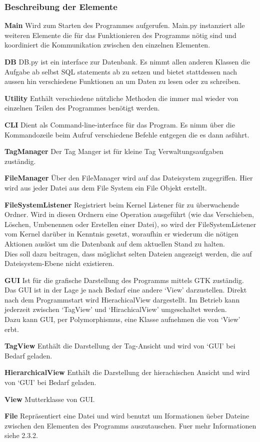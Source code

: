 \documentclass[10pt,paper=a4,final]{scrartcl}
\begin{document}
\subsubsection{Beschreibung der Elemente}
\begin{description}
  \item{\bf Main} Wird zum Starten des Programmes aufgerufen. Main.py instanziert alle weiteren Elemente die f\"ur das Funktionieren des Programms n\"otig sind und koordiniert die Kommunikation zwischen den einzelnen Elementen.
  \item{\bf DB} DB.py ist ein interface zur Datenbank. Es nimmt allen anderen Klassen die Aufgabe ab selbst SQL statements ab zu setzen und bietet stattdessen nach aussen hin verschiedene Funktionen an um Daten zu lesen oder zu schreiben.
  \item{\bf Utility} Enth\"alt verschiedene n\"utzliche Methoden die immer mal wieder von einzelnen Teilen des Programmes ben\"otigt werden.
  \item{\bf CLI} Dient als Command-line-interface f\"ur das Program. Es nimm \"uber die Kommandozeile beim Aufruf verschiedene Befehle entgegen die es dann asf\"uhrt.
  \item{\bf TagManager} Der Tag Manger ist für kleine Tag Verwaltungsaufgaben zuständig.
  \item{\bf FileManager} Über den FileManager wird auf das Dateisystem zugegriffen. Hier wird aus jeder Datei aus dem File System ein File Objekt erstellt.
  \item{\bf FileSystemListener} Registriert beim Kernel Listener f\"ur zu \"uberwachende Ordner. Wird in diesen Ordnern eine Operation ausgef\"uhrt (wie das Verschieben, L\"oschen, Umbenennen oder Erstellen einer Datei), so wird der FileSystemListener vom Kernel dar\"uber in Kenntnis gesetzt, woraufhin er wiederum die n\"otigen Aktionen ausl\"ost um die Datenbank auf dem aktuellen Stand zu halten.\\
    Dies soll dazu beitragen, dass m\"oglichst selten Dateien angezeigt werden, die auf Dateisystem-Ebene nicht existieren.
  \item{\bf GUI} Ist f\"ur die grafische Darstellung des Programms mittels GTK zust\"andig. Das GUI ist in der Lage je nach Bedarf eine andere ‘View’ darzustellen. Direkt nach dem Programmstart wird HierachicalView dargestellt. Im Betrieb kann jederzeit zwischen ‘TagView’ und ‘HirachicalView’ umgeschaltet werden.\\
    Dazu kann GUI, per Polymorphismus, eine Klasse aufnehmen die von ‘View’ erbt.
  \item{\bf TagView} Enth\"alt die Darstellung der Tag-Ansicht und wird von ‘GUI’ bei Bedarf geladen.
  \item{\bf HierarchicalView} Enth\"alt die Darstellung der hierachischen Ansicht und wird von ‘GUI’ bei Bedarf geladen.
  \item{\bf View} Mutterklasse von GUI.
  \item{\bf File} Repr\"asentiert eine Datei und wird benutzt um Iformationen \"ueber Dateine zwischen den Elementen des Programms auszutauschen. Fuer mehr Informationen siehe 2.3.2.
\end{description}
\end{document}
